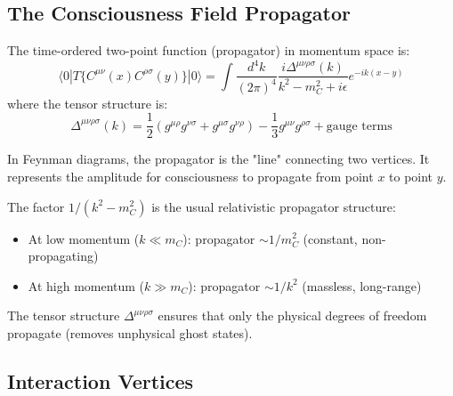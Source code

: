 \subsection{The Consciousness Field Propagator}

\begin{thm}\label{thm:consciousness-propagator}
The time-ordered two-point function (propagator) in momentum space is:
\begin{equation}
\boxed{\langle 0|T\{C^{\mu\nu}(x)C^{\rho\sigma}(y)\}|0\rangle = \int \frac{d^4k}{(2\pi)^4} \frac{i\Delta^{\mu\nu\rho\sigma}(k)}{k^2 - m_C^2 + i\epsilon} e^{-ik(x-y)}}
\end{equation}
where the tensor structure is:
\begin{equation}
\Delta^{\mu\nu\rho\sigma}(k) = \frac{1}{2}(g^{\mu\rho}g^{\nu\sigma} + g^{\mu\sigma}g^{\nu\rho}) - \frac{1}{3}g^{\mu\nu}g^{\rho\sigma} + \text{gauge terms}
\end{equation}
\end{thm}

\begin{intuitive}
In Feynman diagrams, the propagator is the "line" connecting two vertices. It represents the amplitude for consciousness to propagate from point $x$ to point $y$.

The factor $1/(k^2 - m_C^2)$ is the usual relativistic propagator structure:
\begin{itemize}
\item At low momentum ($k \ll m_C$): propagator $\sim 1/m_C^2$ (constant, non-propagating)
\item At high momentum ($k \gg m_C$): propagator $\sim 1/k^2$ (massless, long-range)
\end{itemize}

The tensor structure $\Delta^{\mu\nu\rho\sigma}$ ensures that only the physical degrees of freedom propagate (removes unphysical ghost states).
\end{intuitive}

\subsection{Interaction Vertices}

